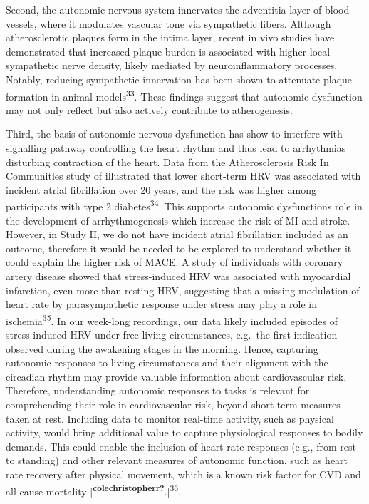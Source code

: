 \documentclass[
  a4paper,
  headsepline=true,
  open=any]{scrbook}
\begin{document}
Second, the autonomic nervous system innervates the adventitia layer of
blood vessels, where it modulates vascular tone via sympathetic fibers.
Although atherosclerotic plaques form in the intima layer, recent in
vivo studies have demonstrated that increased plaque burden is
associated with higher local sympathetic nerve density, likely mediated
by neuroinflammatory processes. Notably, reducing sympathetic
innervation has been shown to attenuate plaque formation in animal
models\textsuperscript{33}. These findings suggest that autonomic
dysfunction may not only reflect but also actively contribute to
atherogenesis.

Third, the basis of autonomic nervous dysfunction has show to interfere
with signalling pathway controlling the heart rhythm and thus lead to
arrhythmias disturbing contraction of the heart. Data from the
Atherosclerosis Risk In Communities study of illustrated that lower
short-term HRV was associated with incident atrial fibrillation over 20
years, and the risk was higher among participants with type 2
diabetes\textsuperscript{34}. This supports autonomic dysfunctions role
in the development of arrhythmogenesis which increase the risk of MI and
stroke. However, in Study II, we do not have incident atrial
fibrillation included as an outcome, therefore it would be needed to be
explored to understand whether it could explain the higher risk of MACE.
A study of individuals with coronary artery disease showed that
stress-induced HRV was associated with myocardial infarction, even more
than resting HRV, suggesting that a missing modulation of heart rate by
parasympathetic response under stress may play a role in
ischemia\textsuperscript{35}. In our week-long recordings, our data
likely included episodes of stress-induced HRV under free-living
circumstances, e.g.~the first indication observed during the awakening
stages in the morning. Hence, capturing autonomic responses to living
circumstances and their alignment with the circadian rhythm may provide
valuable information about cardiovascular risk. Therefore, understanding
autonomic responses to tasks is relevant for comprehending their role in
cardiovascular risk, beyond short-term measures taken at rest. Including
data to monitor real-time activity, such as physical activity, would
bring additional value to capture physiological responses to bodily
demands. This could enable the inclusion of heart rate responses (e.g.,
from rest to standing) and other relevant measures of autonomic
function, such as heart rate recovery after physical movement, which is
a known risk factor for CVD and all-cause mortality
{[}\textsuperscript{\textbf{colechristopherr?}}.{]}\textsuperscript{36}.
\end{document}
